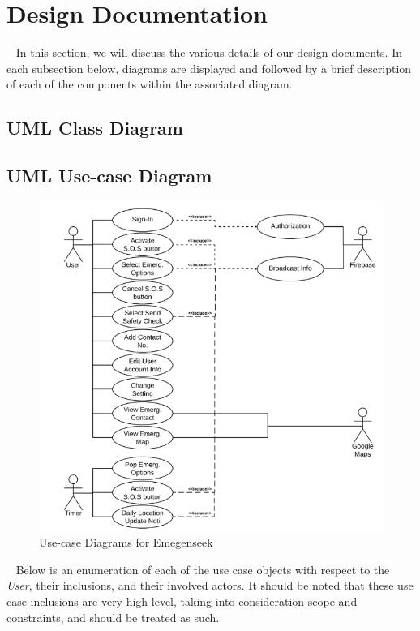 \documentclass[10pt, a4paper]{article}
\begin{document}
\section{Design Documentation}
\par ~ In this section, we will discuss the various details of our design documents. In each subsection below, diagrams are displayed and followed by a brief description of each of the components within the associated diagram.

\subsection{UML Class Diagram}

\subsection{UML Use-case Diagram}
\begin{figure}[H]
  \centerline{
  	\includegraphics[scale=.8]{diagrams/use-case.png}
  }  
  \caption{Use-case Diagrams for Emegenseek}
\end{figure}

\par ~ Below is an enumeration of each of the use case objects with respect to the \emph{User}, their inclusions, and their involved actors. It should be noted that these use case inclusions are very high level, taking into consideration scope and constraints, and should be treated as such.
\end{document}

